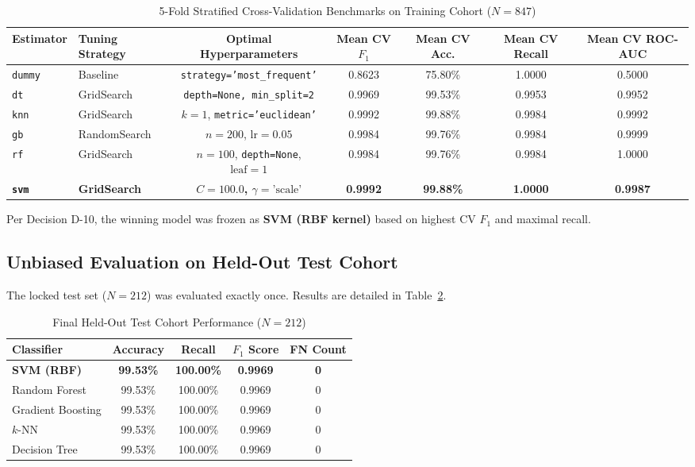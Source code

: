 \documentclass[conference]{IEEEtran}
\begin{document}
\begin{table}[htbp]
\caption{5-Fold Stratified Cross-Validation Benchmarks on Training Cohort ($N=847$)}
\label{tab:cv_benchmarks}
\centering
\begin{tabular}{llccccc}
\toprule
\textbf{Estimator} & \textbf{Tuning Strategy} & \textbf{Optimal Hyperparameters} & \textbf{Mean CV $F_1$} & \textbf{Mean CV Acc.} & \textbf{Mean CV Recall} & \textbf{Mean CV ROC-AUC} \\
\midrule
\texttt{dummy} & Baseline & \texttt{strategy='most\_frequent'} & 0.8623 & 75.80\% & 1.0000 & 0.5000 \\
\texttt{dt} & GridSearch & \texttt{depth=None, min\_split=2} & 0.9969 & 99.53\% & 0.9953 & 0.9952 \\
\texttt{knn} & GridSearch & $k=1$, \texttt{metric='euclidean'} & 0.9992 & 99.88\% & 0.9984 & 0.9992 \\
\texttt{gb} & RandomSearch & $n=200$, $\text{lr}=0.05$ & 0.9984 & 99.76\% & 0.9984 & 0.9999 \\
\texttt{rf} & GridSearch & $n=100$, \texttt{depth=None}, $\text{leaf}=1$ & 0.9984 & 99.76\% & 0.9984 & 1.0000 \\
\textbf{\texttt{svm}} & \textbf{GridSearch} & \textbf{$C=100.0$, $\gamma=\text{'scale'}$} & \textbf{0.9992} & \textbf{99.88\%} & \textbf{1.0000} & \textbf{0.9987} \\
\bottomrule
\end{tabular}
\end{table}

Per Decision D-10, the winning model was frozen as \textbf{SVM (RBF kernel)} based on highest CV $F_1$ and maximal recall.

\subsection{Unbiased Evaluation on Held-Out Test Cohort}
The locked test set ($N=212$) was evaluated exactly once. Results are detailed in Table~\ref{tab:test_performance}.

\begin{table}[htbp]
\caption{Final Held-Out Test Cohort Performance ($N=212$)}
\label{tab:test_performance}
\centering
\begin{tabular}{lcccc}
\toprule
\textbf{Classifier} & \textbf{Accuracy} & \textbf{Recall} & \textbf{$F_1$ Score} & \textbf{FN Count} \\
\midrule
\textbf{SVM (RBF)} & \textbf{99.53\%} & \textbf{100.00\%} & \textbf{0.9969} & \textbf{0} \\
Random Forest & 99.53\% & 100.00\% & 0.9969 & 0 \\
Gradient Boosting & 99.53\% & 100.00\% & 0.9969 & 0 \\
$k$-NN & 99.53\% & 100.00\% & 0.9969 & 0 \\
Decision Tree & 99.53\% & 100.00\% & 0.9969 & 0 \\
\bottomrule
\end{tabular}
\end{table}
\end{document}
